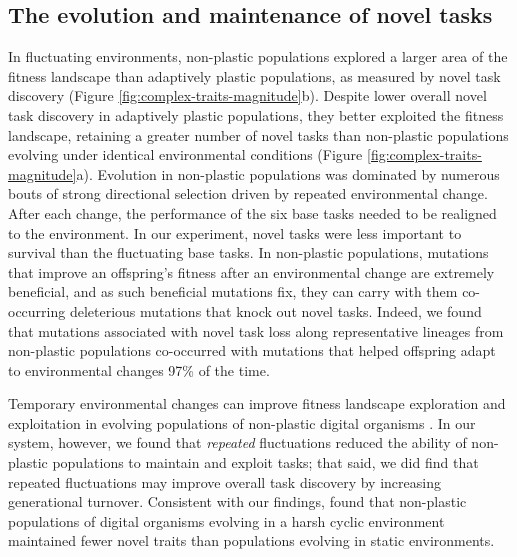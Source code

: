 \subsection{The evolution and maintenance of novel tasks}

In fluctuating environments, non-plastic populations explored a larger area of the fitness landscape than adaptively plastic populations, as measured by novel task discovery (Figure \ref{fig:complex-traits-magnitude}b).
Despite lower overall novel task discovery in adaptively plastic populations, they better exploited the fitness landscape, retaining a greater number of novel tasks than non-plastic populations evolving under identical environmental conditions (Figure \ref{fig:complex-traits-magnitude}a).
Evolution in non-plastic populations was dominated by numerous bouts of strong directional selection driven by repeated environmental change.
After each change, the performance of the six base tasks needed to be realigned to the environment. 
In our experiment, novel tasks were less important to survival than the fluctuating base tasks.
In non-plastic populations, mutations that improve an offspring's fitness after an environmental change are extremely beneficial, and as such beneficial mutations fix, they can carry with them co-occurring deleterious mutations that knock out novel tasks. 
Indeed, we found that mutations associated with novel task loss along representative lineages from non-plastic populations co-occurred with mutations that helped offspring adapt to environmental changes 97\% of the time.

Temporary environmental changes can improve fitness landscape exploration and exploitation in evolving populations of non-plastic digital organisms \citep{nahum_improved_2017}.
In our system, however, we found that \textit{repeated} fluctuations reduced the ability of non-plastic populations to maintain and exploit tasks; that said, we did find that repeated fluctuations may improve overall task discovery by increasing generational turnover. 
Consistent with our findings, \cite{canino-koning_fluctuating_2019} found that non-plastic populations of digital organisms evolving in a harsh cyclic environment maintained fewer novel traits than populations evolving in static environments.

